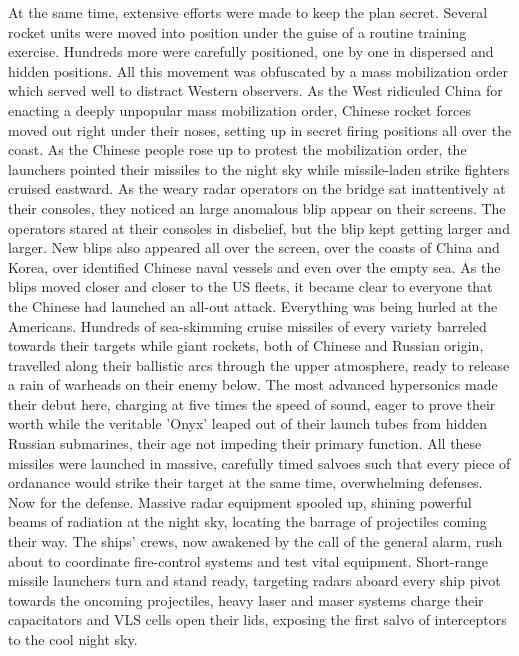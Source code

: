             At the same time, extensive efforts were made to keep the plan secret. Several rocket units were moved into position under the guise of a routine training exercise. Hundreds more were carefully positioned, one by one in dispersed and hidden positions. All this movement was obfuscated by a mass mobilization order which served well to distract Western observers. 
            As the West ridiculed China for enacting a deeply unpopular mass mobilization order, Chinese rocket forces moved out right under their noses, setting up in secret firing positions all over the coast. As the Chinese people rose up to protest the mobilization order, the launchers pointed their missiles to the night sky while missile-laden strike fighters cruised eastward. As the weary radar operators on the bridge sat inattentively at their consoles, they noticed an large anomalous blip appear on their screens.
            The operators stared at their consoles in disbelief, but the blip kept getting larger and larger. New blips also appeared all over the screen, over the coasts of China and Korea, over identified Chinese naval vessels and even over the empty sea. As the blips moved closer and closer to the US fleets, it became clear to everyone that the Chinese had launched an all-out attack.
            Everything was being hurled at the Americans. Hundreds of sea-skimming cruise missiles of every variety barreled towards their targets while giant rockets, both of Chinese and Russian origin, travelled along their ballistic arcs through the upper atmosphere, ready to release a rain of warheads on their enemy below. The most advanced hypersonics made their debut here, charging at five times the speed of sound, eager to prove their worth while the veritable 'Onyx' leaped out of their launch tubes from hidden Russian submarines, their age not impeding their primary function. All these missiles were launched in massive, carefully timed salvoes such that every piece of ordanance would strike their target at the same time, overwhelming defenses.
            Now for the defense. Massive radar equipment spooled up, shining powerful beams of radiation at the night sky, locating the barrage of projectiles coming their way. The ships' crews, now awakened by the call of the general alarm, rush about to coordinate fire-control systems and test vital equipment. Short-range missile launchers turn and stand ready, targeting radars aboard every ship pivot towards the oncoming projectiles, heavy laser and maser systems charge their capacitators and VLS cells open their lids, exposing the first salvo of interceptors to the cool night sky.
